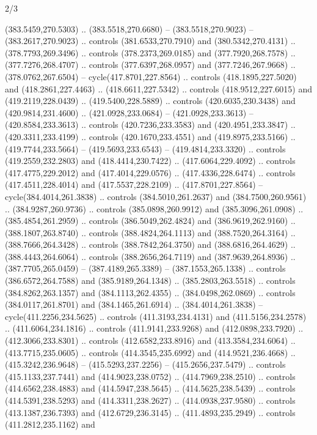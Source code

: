 \begin{flagdescription}{2/3}
\begin{scope}[xshift=0.5\flaglength,yshift=0.5\flagwidth,scale=\flagwidth/495.65]
\begin{scope}[y=0.8pt, x=0.8pt, yscale=-1,shift={(-463.76,-309.78)}]
  (383.5459,270.5303) .. (383.5518,270.6680) -- (383.5518,270.9023) --
  (383.2617,270.9023) .. controls (381.6533,270.7910) and (380.5342,270.4131) ..
  (378.7793,269.3496) .. controls (378.2373,269.0185) and (377.7920,268.7578) ..
  (377.7276,268.4707) .. controls (377.6397,268.0957) and (377.7246,267.9668) ..
  (378.0762,267.6504) -- cycle(417.8701,227.8564) .. controls
  (418.1895,227.5020) and (418.2861,227.4463) .. (418.6611,227.5342) .. controls
  (418.9512,227.6015) and (419.2119,228.0439) .. (419.5400,228.5889) .. controls
  (420.6035,230.3438) and (420.9814,231.4600) .. (421.0928,233.0684) --
  (421.0928,233.3613) -- (420.8584,233.3613) .. controls (420.7236,233.3583) and
  (420.4951,233.3847) .. (420.3311,233.4199) .. controls (420.1670,233.4551) and
  (419.8975,233.5166) .. (419.7744,233.5664) -- (419.5693,233.6543) --
  (419.4814,233.3320) .. controls (419.2559,232.2803) and (418.4414,230.7422) ..
  (417.6064,229.4092) .. controls (417.4775,229.2012) and (417.4014,229.0576) ..
  (417.4336,228.6474) .. controls (417.4511,228.4014) and (417.5537,228.2109) ..
  (417.8701,227.8564) -- cycle(384.4014,261.3838) .. controls
  (384.5010,261.2637) and (384.7500,260.9561) .. (384.9287,260.9736) .. controls
  (385.0898,260.9912) and (385.3096,261.0908) .. (385.4854,261.2959) .. controls
  (386.5049,262.4824) and (386.9619,262.9160) .. (388.1807,263.8740) .. controls
  (388.4824,264.1113) and (388.7520,264.3164) .. (388.7666,264.3428) .. controls
  (388.7842,264.3750) and (388.6816,264.4629) .. (388.4443,264.6064) .. controls
  (388.2656,264.7119) and (387.9639,264.8936) .. (387.7705,265.0459) --
  (387.4189,265.3389) -- (387.1553,265.1338) .. controls (386.6572,264.7588) and
  (385.9189,264.1348) .. (385.2803,263.5518) .. controls (384.8262,263.1357) and
  (384.1113,262.4355) .. (384.0498,262.0869) .. controls (384.0117,261.8701) and
  (384.1465,261.6914) .. (384.4014,261.3838) -- cycle(411.2256,234.5625) ..
  controls (411.3193,234.4131) and (411.5156,234.2578) .. (411.6064,234.1816) ..
  controls (411.9141,233.9268) and (412.0898,233.7920) .. (412.3066,233.8301) ..
  controls (412.6582,233.8916) and (413.3584,234.6064) .. (413.7715,235.0605) ..
  controls (414.3545,235.6992) and (414.9521,236.4668) .. (415.3242,236.9648) --
  (415.5293,237.2256) -- (415.2656,237.5479) .. controls (415.1133,237.7441) and
  (414.9023,238.0752) .. (414.7969,238.2510) .. controls (414.6562,238.4883) and
  (414.5947,238.5645) .. (414.5625,238.5439) .. controls (414.5391,238.5293) and
  (414.3311,238.2627) .. (414.0938,237.9580) .. controls (413.1387,236.7393) and
  (412.6729,236.3145) .. (411.4893,235.2949) .. controls (411.2812,235.1162) and

\end{scope}
\end{scope}
\end{flagdescription}
